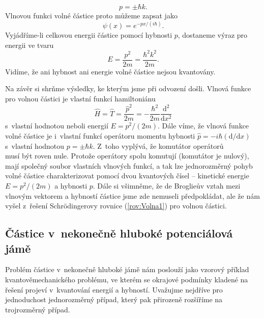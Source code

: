 \begin{equation}
p = \pm \hbar k \mbox{.}
\label{rov:Volna9}
\end{equation}
Vlnovou funkci volné částice proto můžeme zapsat jako
\begin{equation}
\psi(x) = e^{-px/(i\hbar)} \mbox{.}
\label{rov:Volna10}
\end{equation}
Vyjádříme-li celkovou energii částice pomocí hybnosti $p$, dostaneme výraz pro energii ve tvaru
\begin{equation}
E = \frac{p^2}{2m} = \frac{\hbar^2k^2}{2m} \mbox{.}
\label{rov:Volna11}
\end{equation}
Vidíme, že ani hybnost ani energie volné částice nejsou kvantovány.

Na závěr si shrňme výsledky, ke kterým jsme při odvození došli. Vlnová funkce pro volnou částici je vlastní funkcí hamiltoniánu
\begin{equation}
\hat{H} = \hat{T} = \frac{\hat{p}^2}{2m} = -\frac{\hbar^2}{2m}\frac{\mathrm{d}^2}{\mathrm{d}x^2}
\label{rov:Volna12}
\end{equation}
s~vlastní hodnotou neboli energií $E = p^2/(2m)$. Dále víme, že vlnová funkce volné částice je i~vlastní funkcí operátoru momentu hybnosti $\hat{p} = -i\hbar ({\mathrm{d}}/{\mathrm{d}x})$ s~vlastní hodnotou $p = \pm \hbar k$. Z~toho vyplývá, že komutátor operátorů
\begin{equation}
[\hat{T},\hat{p}]
\label{rov:Volna13}
\end{equation}
musí být roven nule. Protože operátory spolu komutují (komutátor je nulový), mají společný soubor vlastních vlnových funkcí, a tak lze jednorozměrný pohyb volné částice charakterizovat pomocí dvou kvantových čísel -- kinetické energie $E = p^2/(2m)$ a hybnosti $p$. Dále si všimněme, že de Broglieův vztah mezi vlnovým vektorem a hybností částice jsme zde nemuseli předpokládat, ale že nám vyšel z~řešení Schrödingerovy rovnice (\ref{rov:Volna1}) pro volnou částici.

\subsection{Částice v~nekonečně hluboké potenciálová jámě}
\label{kap:CasticeJama}

Problém částice v~nekonečně hluboké jámě nám poslouží jako vzorový příklad kvantověmechanického problému, ve kterém se okrajové podmínky kladené na řešení projeví v~kvantování energií a hybností. Uvažujme nejdříve pro jednoduchost jednorozměrný případ, který pak přirozeně rozšíříme na trojrozměrný případ.

